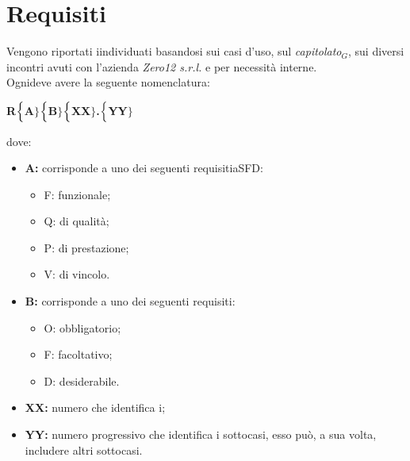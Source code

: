 \chapter{Requisiti} \label{Requisiti}
Vengono riportati iindividuati basandosi sui casi d'uso, sul \textit{capitolato$_{G}$}, sui diversi incontri avuti con l'azienda \textit{Zero12 s.r.l.} e per necessità interne. \\

Ognideve avere la seguente nomenclatura:
\begin{center}
	\textbf{R$\Bigl\{$A$\Bigr\}$$\Bigl\{$B$\Bigr\}$$\Bigl\{$XX$\Bigr\}$.$\Bigl\{$YY$\Bigr\}$}
\end{center}
dove:
\begin{itemize}
	\item \textbf{A:} corrisponde a uno dei seguenti requisitiaSFD:
	\begin{itemize}
		\item F: funzionale;
		\item Q: di qualità;
		\item P: di prestazione;
		\item V: di vincolo.
	\end{itemize}
	\item \textbf{B:} corrisponde a uno dei seguenti requisiti:
	\begin{itemize}
		\item O: obbligatorio;
		\item F: facoltativo;
		\item D: desiderabile.
	\end{itemize}
	\item \textbf{{XX}:} numero che identifica i;
	\item \textbf{{YY}:} numero progressivo che identifica i sottocasi, esso può, a sua volta, includere altri sottocasi.
\end{itemize}
\pagebreak
